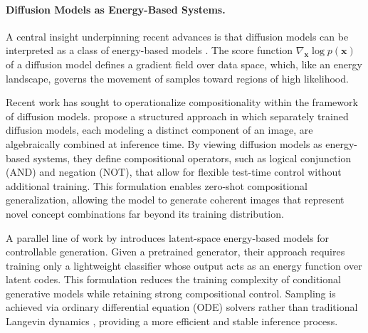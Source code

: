 \paragraph{Diffusion Models as Energy-Based Systems.}
A central insight underpinning recent advances is that diffusion models can be interpreted as a class of energy-based models \citep{du2023reduce}.  
The score function $\nabla_\mathbf{x}\log p(\mathbf{x})$ of a diffusion model defines a gradient field over data space, which, like an energy landscape, governs the movement of samples toward regions of high likelihood.  

Recent work has sought to operationalize compositionality within the framework of diffusion models.  
\citet{liu2022compositional} propose a structured approach in which separately trained diffusion models, each modeling a distinct component of an image, are algebraically combined at inference time.  
By viewing diffusion models as energy-based systems, they define compositional operators, such as logical conjunction (AND) and negation (NOT), that allow for flexible test-time control without additional training.  
This formulation enables zero-shot compositional generalization, allowing the model to generate coherent images that represent novel concept combinations far beyond its training distribution.

A parallel line of work by \citet{nie2021controllable} introduces latent-space energy-based models for controllable generation.  
Given a pretrained generator, their approach requires training only a lightweight classifier whose output acts as an energy function over latent codes.  
This formulation reduces the training complexity of conditional generative models while retaining strong compositional control.  
Sampling is achieved via ordinary differential equation (ODE) solvers rather than traditional Langevin dynamics \citep{NEURIPS2019_3001ef25, vincent_score_matching_2011}, providing a more efficient and stable inference process.  


